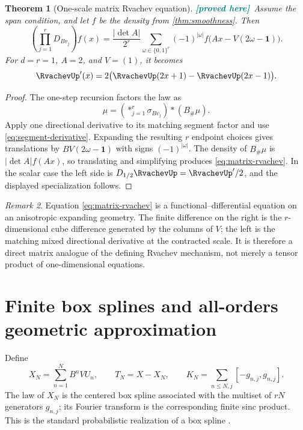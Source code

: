 \documentclass[11pt,oneside]{article}
\newtheorem{theorem}{Theorem}[section]
\theoremstyle{definition}
\theoremstyle{remark}
\newtheorem{remark}[theorem]{Remark}
\newcommand{\AllOnesVector}{\boldsymbol{1}}
\newcommand{\New}{\textcolor{teal}{\textbf{[proved here]}}}
\begin{document}
\begin{theorem}[One-scale matrix Rvachev equation]
\label{thm:matrix-rvachev}
\New\ Assume the span condition, and let $f$ be the density from
\cref{thm:smoothness}.  Then
\begin{equation}
 \left(\prod_{j=1}^rD_{Bv_j}\right)f(x)
 =\frac{|\det A|}{2^r}
  \sum_{\omega\in\{0,1\}^r}(-1)^{|\omega|}
  f\bigl(Ax-V(2\omega-\AllOnesVector)\bigr).
 \label{eq:matrix-rvachev}
\end{equation}
For $d=r=1$, $A=2$, and $V=(1)$, it becomes
\begin{equation}
 \RvachevUp'(x)=2\bigl(\RvachevUp(2x+1)-\RvachevUp(2x-1)\bigr).
 \label{eq:scalar-rvachev}
\end{equation}
\end{theorem}

\begin{proof}
The one-step recursion factors the law as
\[
 \mu=\left(*_{j=1}^r\sigma_{Bv_j}\right)*(B_\#\mu).
\]
Apply one directional derivative to its matching segment factor and use
\eqref{eq:segment-derivative}.  Expanding the resulting $r$ endpoint choices
gives translations by
$BV(2\omega-\AllOnesVector)$ with signs $(-1)^{|\omega|}$.  The density of $B_\#\mu$ is
$|\det A|f(Ax)$, so translating and simplifying produces
\eqref{eq:matrix-rvachev}.  In the scalar case the left side is
$D_{1/2}\RvachevUp=\RvachevUp'/2$, and the displayed specialization follows.
\end{proof}

\begin{remark}
Equation \eqref{eq:matrix-rvachev} is a functional--differential equation on an
anisotropic expanding geometry.  The finite difference on the right is the
$r$-dimensional cube difference generated by the columns of $V$; the left is the
matching mixed directional derivative at the contracted scale.  It is therefore
a direct matrix analogue of the defining Rvachev mechanism, not merely a tensor
product of one-dimensional equations.
\end{remark}

\section{Finite box splines and all-orders geometric approximation}
\label{sec:box-splines}

Define
\begin{equation}
 X_N=\sum_{n=1}^NB^nVU_n,
 \qquad
 T_N=X-X_N,
 \qquad
 K_N=\sum_{n\le N,j}[-g_{n,j},g_{n,j}].
 \label{eq:prefix-tail}
\end{equation}
The law of $X_N$ is the centered box spline associated with the multiset of
$rN$ generators $g_{n,j}$; its Fourier transform is the corresponding finite
sinc product.  This is the standard probabilistic realization of a box spline
\cite{deBoorBoxSplines}.
\end{document}
